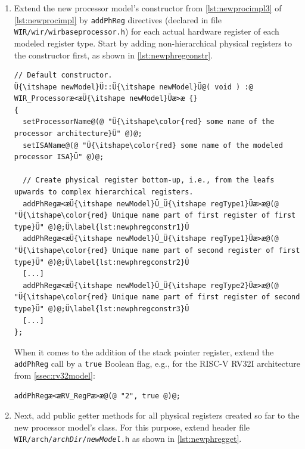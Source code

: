 \begin{enumerate}[resume]
  \item Extend the new processor model's constructor from \cref{lst:newprocimpl3} of \cref{lst:newprocimpl} by \texttt{addPhReg} directives (declared in file \texttt{WIR/wir/wirbaseprocessor.h}) for each actual hardware register of each modeled register type.
  Start by adding non-hierarchical physical registers to the constructor first, as shown in \cref{lst:newphregconstr}.

\begin{lstlisting}[style=code,float=!t,caption={Construction of Physical Registers by a New Processor Model's Class},label=lst:newphregconstr]
// Default constructor.
Ü{\itshape newModel}Ü::Ü{\itshape newModel}Ü@( void ) :@ WIR_Processoræ<æÜ{\itshape newModel}Üæ>æ {}
{
  setProcessorName@(@ "Ü{\itshape\color{red} some name of the processor architecture}Ü" @)@;
  setISAName@(@ "Ü{\itshape\color{red} some name of the modeled processor ISA}Ü" @)@;

  // Create physical register bottom-up, i.e., from the leafs upwards to complex hierarchical registers.
  addPhRegæ<æÜ{\itshape newModel}Ü_Ü{\itshape regType1}Üæ>æ@(@ "Ü{\itshape\color{red} Unique name part of first register of first type}Ü" @)@;Ü\label{lst:newphregconstr1}Ü
  addPhRegæ<æÜ{\itshape newModel}Ü_Ü{\itshape regType1}Üæ>æ@(@ "Ü{\itshape\color{red} Unique name part of second register of first type}Ü" @)@;Ü\label{lst:newphregconstr2}Ü
  [...]
  addPhRegæ<æÜ{\itshape newModel}Ü_Ü{\itshape regType2}Üæ>æ@(@ "Ü{\itshape\color{red} Unique name part of first register of second type}Ü" @)@;Ü\label{lst:newphregconstr3}Ü
  [...]
};
\end{lstlisting}

  When it comes to the addition of the stack pointer register, extend the \texttt{addPhReg} call by a \texttt{true} Boolean flag, e.g., for the RISC-V RV32I architecture from \cref{ssec:rv32model}:
\begin{lstlisting}[style=code,float=!h,xleftmargin=10mm,belowskip=-0.8 \baselineskip]
addPhRegæ<æRV_RegPæ>æ@(@ "2", true @)@;
\end{lstlisting}

  \item Next, add public getter methods for all physical registers created so far to the new processor model's class.\label{enum:phreggetters}
  For this purpose, extend header file \texttt{WIR/arch/{\itshape archDir}/{\itshape newModel}.h} as shown in \cref{lst:newphregget}.


\end{enumerate}
